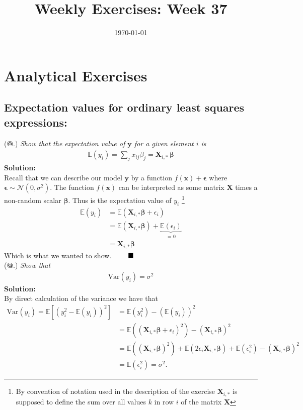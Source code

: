 \documentclass[12pt,
               a4paper,
               article,
               oneside,
               norsk,oldfontcommands]{memoir}
\date{\today}
\title{Weekly Exercises: Week 37}
\makeatletter
\newcommand*{\rom}[1]{\expandafter\@slowromancap\romannumeral #1@}
\newcommand{\Q}{ \qquad \hfill \blacksquare}
\newcommand{\spaze}{\vspace{4mm}\\}
\makeatother
\begin{document}
\header{}
\section*{\centering Analytical Exercises}
\subsection*{\centering Expectation values for ordinary least squares expressions:}
(\textbf{\rom{1}}.) \emph{Show that the expectation value of $\mathbf{y}$ for a given element $i$ is} \begin{align*}
\mathbb{E}(y_i)  =\sum_{j}x_{ij} \beta_j=\mathbf{X}_{i, \ast} \, \boldsymbol{\beta}
\end{align*}
\textbf{Solution:} \spaze
Recall that we can describe our model $\mathbf{y}$ by a function $ f(\mathbf{x}) + \boldsymbol{\epsilon}$ where $ \boldsymbol{\epsilon} \sim \mathcal{N}(0, \sigma^2)$. The function $ f(\mathbf{x})$ can be interpreted as some matrix $\mathbf{X}$ times a non-random scalar $\boldsymbol{\beta}$. Thus is the expectation value of $y_i$ \footnote{By convention of notation used in the description of the exercise $ \mathbf{X}_{i,*}$ is supposed to define the sum over all values $k$ in row $i$ of the matrix $\mathbf{X}$}
\begin{align*}
\mathbb{E}(y_i) &= \mathbb{E}(\mathbf{X}_{i,*} \boldsymbol{\beta} + \epsilon_{i} ) \\[5pt]
 &= \mathbb{E}(\mathbf{X}_{i,*} \boldsymbol{\beta}) + \underbrace{\mathbb{E}( \epsilon_{i} )}_\text{ = 0} \\[5pt]
 &= \mathbf{X}_{i,*} \boldsymbol{\beta}
\end{align*}
Which is what we wanted to show. $\Q$ \spaze 
(\textbf{\rom{2}}.) \emph{Show that}
\begin{align*}
\text{Var}(y_i) = \sigma^2
\end{align*} 
\textbf{Solution:} \spaze 
By direct calculation of the variance we have that 
\begin{align*}
\text{Var}(y_i) = \mathbb{E} \left[ ( y_{i}^2 - \mathbb{E}(y_i)) ^2\right] &= \mathbb{E}(y_{i}^2) - (\mathbb{E}(y_{i}))^2 \\[5pt]
&= \mathbb{E}((\mathbf{X}_{i, *} \boldsymbol{\beta} + \epsilon_{i})^2) - (\mathbf{X}_{i,*} \boldsymbol{\beta})^2 \\[5pt] 
&=  \mathbb{E}((\mathbf{X}_{i,*} \boldsymbol{\beta})^2) +  \mathbb{E}(2 \epsilon_{i} \mathbf{X}_{i, *} \boldsymbol{\beta}) +   \mathbb{E}(\epsilon_{i}^2) - (\mathbf{X}_{i,*} \boldsymbol{\beta})^2  \\[5pt] 
&= \mathbb{E}(\epsilon_{i}^2) = \sigma^2.
\end{align*}
\end{document}
